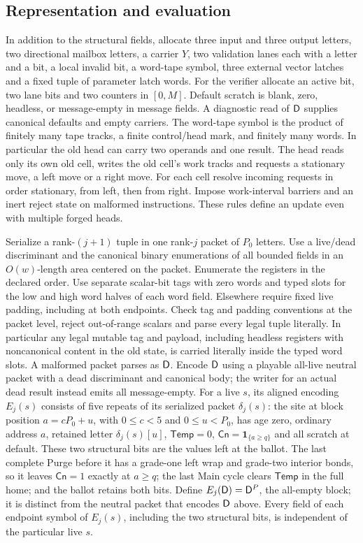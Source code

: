 \subsection{Representation and evaluation}\label{sec:packets}

In addition to the structural fields, allocate three input and three output letters, two directional mailbox letters, a carrier \(Y\), two validation lanes each with a letter and a bit, a local invalid bit, a word-tape symbol, three external vector latches and a fixed tuple of parameter latch words. For the verifier allocate an active bit, two lane bits and two counters in \([0,M]\). Default scratch is blank, zero, headless, or message-empty in message fields. A diagnostic read of \(\mathsf D\) supplies canonical defaults and empty carriers. The word-tape symbol is the product of finitely many tape tracks, a finite control/head mark, and finitely many words. In particular the old head can carry two operands and one result. The head reads only its own old cell, writes the old cell's work tracks and requests a stationary move, a left move or a right move. For each cell resolve incoming requests in order stationary, from left, then from right. Impose work-interval barriers and an inert reject state on malformed instructions. These rules define an update even with multiple forged heads.

Serialize a rank-\((j+1)\) tuple in one rank-\(j\) packet of \(P_0\) letters. Use a live/dead discriminant and the canonical binary enumerations of all bounded fields in an \(O(w)\)-length area centered on the packet. Enumerate the registers in the declared order. Use separate scalar-bit tags with zero words and typed slots for the low and high word halves of each word field. Elsewhere require fixed live padding, including at both endpoints. Check tag and padding conventions at the packet level, reject out-of-range scalars and parse every legal tuple literally. In particular any legal mutable tag and payload, including headless registers with noncanonical content in the old state, is carried literally inside the typed word slots. A malformed packet parses as \(\mathsf D\). Encode \(\mathsf D\) using a playable all-live neutral packet with a dead discriminant and canonical body; the writer for an actual dead result instead emits all message-empty. For a live \(s\), its aligned encoding \(E_j(s)\) consists of five repeats of its serialized packet \(\delta_j(s)\): the site at block position \(a=cP_0+u\), with \(0\le c<5\) and \(0\le u<P_0\), has age zero, ordinary address \(a\), retained letter \(\delta_j(s)[u]\), \(\mathsf{Temp}=0\), \(\mathsf{Cn}=\mathbf 1_{\{a\ge q\}}\) and all scratch at default. These two structural bits are the values left at the ballot. The last complete Purge before it has a grade-one left wrap and grade-two interior bonds, so it leaves \(\mathsf{Cn}=1\) exactly at \(a\ge q\); the last Main cycle clears \(\mathsf{Temp}\) in the full home; and the ballot retains both bits. Define \(E_j(\mathsf D)=\mathsf D^P\), the all-empty block; it is distinct from the neutral packet that encodes \(\mathsf D\) above. Every field of each endpoint symbol of \(E_j(s)\), including the two structural bits, is independent of the particular live \(s\).

